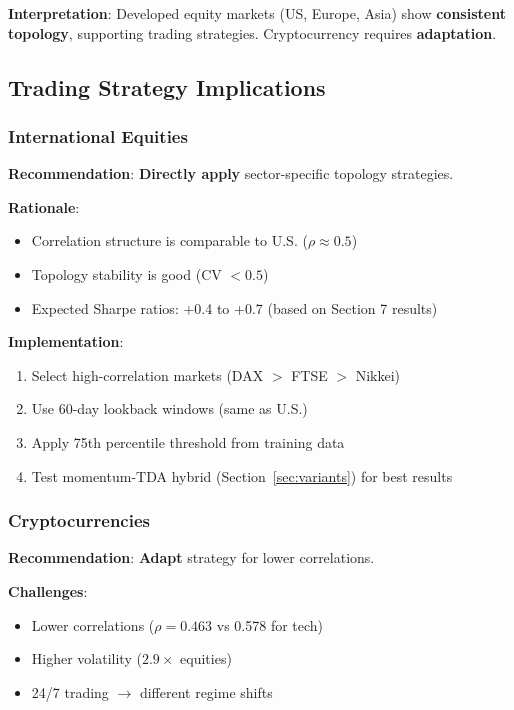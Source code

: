 \textbf{Interpretation}: Developed equity markets (US, Europe, Asia) show \textbf{consistent topology}, supporting trading strategies. Cryptocurrency requires \textbf{adaptation}.

\subsection{Trading Strategy Implications}

\subsubsection{International Equities}

\textbf{Recommendation}: \textbf{Directly apply} sector-specific topology strategies.

\textbf{Rationale}:
\begin{itemize}
\item Correlation structure is comparable to U.S. ($\rho \approx 0.5$)
\item Topology stability is good (CV $< 0.5$)
\item Expected Sharpe ratios: +0.4 to +0.7 (based on Section 7 results)
\end{itemize}

\textbf{Implementation}:
\begin{enumerate}
\item Select high-correlation markets (DAX $>$ FTSE $>$ Nikkei)
\item Use 60-day lookback windows (same as U.S.)
\item Apply 75th percentile threshold from training data
\item Test momentum-TDA hybrid (Section~\ref{sec:variants}) for best results
\end{enumerate}

\subsubsection{Cryptocurrencies}

\textbf{Recommendation}: \textbf{Adapt} strategy for lower correlations.

\textbf{Challenges}:
\begin{itemize}
\item Lower correlations ($\rho = 0.463$ vs 0.578 for tech)
\item Higher volatility ($2.9\times$ equities)
\item 24/7 trading $\rightarrow$ different regime shifts
\end{itemize}

